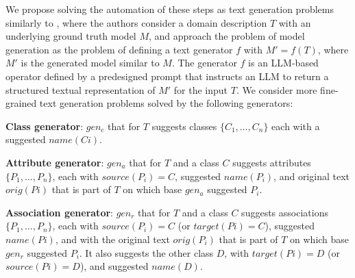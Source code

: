We propose solving the automation of these steps as text generation problems similarly to \citet{Chen2023}, where the authors consider a domain description $T$ with an underlying ground truth model $M$, and approach the problem of model generation as the problem of defining a text generator $f$ with $M' = f(T)$, where $M'$ is the generated model similar to $M$. The generator $f$ is an LLM-based operator defined by a predesigned prompt that instructs an LLM to return a structured textual representation of $M'$ for the input $T$. We consider more fine-grained text generation problems solved by the following generators:

\textbf{Class generator}: $gen_c$ that for $T$ suggests classes $\{C_1, \ldots, C_n\}$ each with a suggested $name(Ci)$.

\textbf{Attribute generator}: $gen_a$ that for $T$ and a class $C$ suggests attributes $\{P_1, \ldots, P_n\}$, each with $source(P_i) = C$, suggested $name(P_i)$, and original text $orig(Pi)$ that is part of $T$ on which base $gen_a$ suggested $P_i$.

\textbf{Association generator}: $gen_r$ that for $T$ and a class $C$ suggests associations $\{P_1, \ldots, P_n\}$, each with $source(P_i) = C$ (or $target(Pi) = C$), suggested $name(Pi)$, and with the original text $orig(P_i)$ that is part of $T$ on which base $gen_r$ suggested $P_i$. It also suggests the other class $D$, with $target(Pi)= D$ (or $source(Pi) = D$), and suggested $name(D)$.